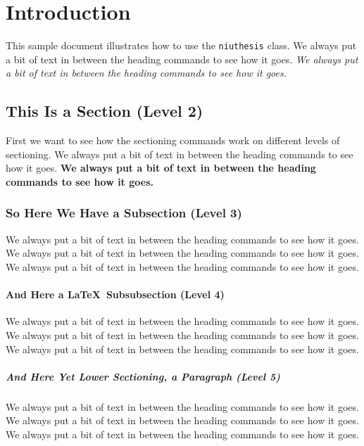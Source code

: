 \chapter{Introduction}		%
\label{introchap}		%

This sample document illustrates how to use the
{\tt niuthesis} class.
We always put a bit of text in between the heading commands to see how it goes.
\emph{We always put a bit of text in between the heading commands to see how it goes.}

\section{This Is a Section (Level 2)}

First we want to see how the sectioning commands work on different
levels of sectioning.
We always put a bit of text in between the heading commands to see how it goes.
\textbf{We always put a bit of text in between the heading commands to see how it goes.}

\subsection{So Here We Have a Subsection (Level 3)}

We always put a bit of text in between the heading commands to see how it goes.
We always put a bit of text in between the heading commands to see how it goes.
We always put a bit of text in between the heading commands to see how it goes.

\subsubsection{And Here a \LaTeX\ Subsubsection  (Level 4)}

We always put a bit of text in between the heading commands to see how it goes.
We always put a bit of text in between the heading commands to see how it goes.
We always put a bit of text in between the heading commands to see how it goes.

\paragraph{And Here Yet Lower Sectioning, a Paragraph (Level 5)}

We always put a bit of text in between the heading commands to see how it goes.
We always put a bit of text in between the heading commands to see how it goes.
We always put a bit of text in between the heading commands to see how it goes.

